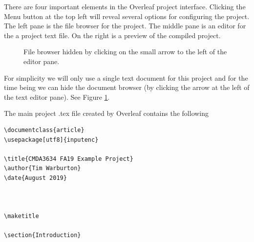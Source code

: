 There are four important elements in the Overleaf project interface. Clicking the Menu button at the top left will reveal several options for configuring the project. The left pane is the file browser for the project. The middle pane is an editor for the a project text file. On the right is a preview of the compiled project.

\begin{figure}[htbp!]
    \centering
    \caption{File browser hidden by clicking on the small arrow to the left of the editor pane.}
    \label{overleafBlankProjectCollapsedFileBrowser.fig}
\end{figure}

\newpage
For simplicity we will only use a single text document for this project and for the time being we can hide the document browser (by clicking the arrow at the left of the text editor pane). See Figure \ref{overleafBlankProjectCollapsedFileBrowser.fig}. 

The main project .tex file created by Overleaf contains the following

\begin{verbatim}
\documentclass{article}
\usepackage[utf8]{inputenc}

\title{CMDA3634 FA19 Example Project}
\author{Tim Warburton}
\date{August 2019}



\maketitle

\section{Introduction}


\end{verbatim}

